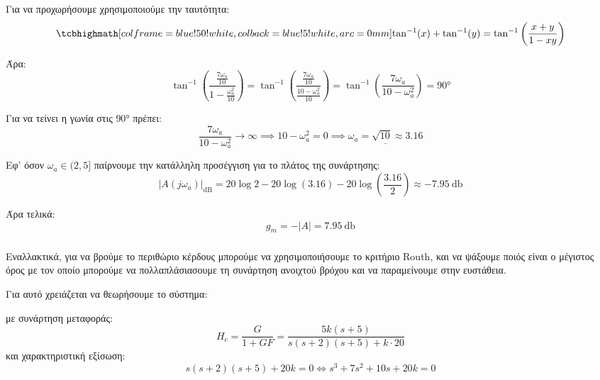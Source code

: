 \documentclass[11pt,a4paper,notitlepage,fleqn,final]{article}
\begin{document}
\begin{exercise}
\begin{enumgreekparen}
	Για να προχωρήσουμε χρησιμοποιούμε την ταυτότητα:
	\[
	\infoboxed{
		\tan^{-1}(x) + \tan^{-1}(y) = \tan^{-1} \left( \frac{x+y}{1-xy} \right)	
	}
	\]
	
	Άρα:
	\[
	\tan^{-1}\left(\frac{\frac{7\omega_a}{10}}{1-\frac{\omega_a^2}{10}}\right)
	= \tan^{-1}\left(\frac{\frac{7\omega_a}{10}}{\frac{10-\omega_a^2}{10}}\right)
	= \tan^{-1}\left(\frac{7\omega_a}{10-\omega_a^2}\right) = \ang{90}
	\]
	
	Για να τείνει η γωνία στις \( \ang{90} \) πρέπει:
	\[
	\frac{7\omega_a}{10-\omega_a^2} \to \infty \implies 10-\omega_a^2 = 0 \implies \underline{\omega_a = \sqrt{10} \approx 3.16}
	\]
	
	Εφ' όσον \( \omega_a \in (2,5] \) παίρνουμε την κατάλληλη προσέγγιση για το πλάτος της συνάρτησης:
	\[
	\left| A(j\omega_a) \right|_{\mathrm{dB}} = 20\log 2-20\log(3.16)-20\log\left(\frac{3.16}{2}\right) \approx
	\SI{-7.95}{\decibel}
	\]
	
	Άρα τελικά:
	\[
	g_m = - |A| = \SI{7.95}{\decibel}
	\]
	
	\subparagraph{}
	Εναλλακτικά, για να βρούμε το περιθώριο κέρδους μπορούμε να χρησιμοποιήσουμε το κριτήριο Routh, και να ψάξουμε ποιός
	είναι ο μέγιστος όρος με τον οποίο μπορούμε να πολλαπλάσιασουμε τη συνάρτηση ανοιχτού βρόχου και να παραμείνουμε στην
	ευστάθεια.
	
	Για αυτό χρειάζεται να θεωρήσουμε το σύστημα:
	
	
	με συνάρτηση μεταφοράς:
	\[
	H_c = \frac{G}{1+GF} = \frac{5k(s+5)}{s(s+2)(s+5)+k\cdot 20}
	\]
	και χαρακτηριστική εξίσωση:
	\[ s(s+2)(s+5)+20k = 0 \iff s^3+7s^2+10s+20k = 0 \]
	

\end{enumgreekparen}
\end{exercise}
\end{document}
